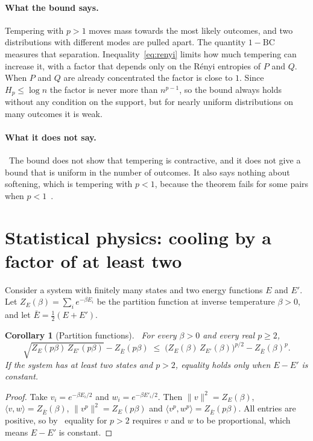 \documentclass[11pt]{article}
\newtheorem{corollary}{Corollary}[section]
\theoremstyle{remark}
\newcommand{\ip}[2]{\langle #1,#2\rangle}
\newcommand{\BC}{\mathrm{BC}}
\newcommand{\claimtag}[2]{\tcbox[on line,boxsep=1pt,left=3pt,right=3pt,top=0pt,bottom=0pt,colback=#1!10,colframe=#1!70,boxrule=0.4pt,arc=1.5pt]{\sffamily\scriptsize\bfseries\color{#1}#2}}
\newcommand{\consequence}{\claimtag{ForestGreen}{PROVED HERE}}
\newcommand{\nofollow}{\claimtag{warn}{DOES NOT FOLLOW}}
\begin{document}
\paragraph{What the bound says.} Tempering with $p>1$ moves mass towards the most likely outcomes, and two distributions with different modes are pulled apart. The quantity $1-\BC$ measures that separation. Inequality~\eqref{eq:renyi} limits how much tempering can increase it, with a factor that depends only on the Rényi entropies of $P$ and $Q$. When $P$ and $Q$ are already concentrated the factor is close to $1$. Since $H_p\le\log n$ the factor is never more than $n^{p-1}$, so the bound always holds without any condition on the support, but for nearly uniform distributions on many outcomes it is weak.

\paragraph{What it does not say.} \nofollow\ The bound does not show that tempering is contractive, and it does not give a bound that is uniform in the number of outcomes. It also says nothing about softening, which is tempering with $p<1$, because the theorem fails for some pairs when $p<1$~\cite{JPTV}.

\section{Statistical physics: cooling by a factor of at least two}\label{sec:phys}

Consider a system with finitely many states and two energy functions $E$ and $E'$. Let $Z_E(\beta)=\sum_ie^{-\beta E_i}$ be the partition function at inverse temperature $\beta>0$, and let $\bar E=\frac12(E+E')$.

\begin{corollary}[Partition functions]\label{cor:gibbs}
\consequence\ For every $\beta>0$ and every real $p\ge2$,
\[
\sqrt{Z_E(p\beta)\,Z_{E'}(p\beta)}-Z_{\bar E}(p\beta)\;\le\;\bigl(Z_E(\beta)\,Z_{E'}(\beta)\bigr)^{p/2}-Z_{\bar E}(\beta)^p .
\]
If the system has at least two states and $p>2$, equality holds only when $E-E'$ is constant.
\end{corollary}

\begin{proof}
Take $v_i=e^{-\beta E_i/2}$ and $w_i=e^{-\beta E'_i/2}$. Then $\|v\|^2=Z_E(\beta)$, $\ip vw=Z_{\bar E}(\beta)$, $\|v^p\|^2=Z_E(p\beta)$ and $\ip{v^p}{w^p}=Z_{\bar E}(p\beta)$. All entries are positive, so by~\cite[Theorem~2]{Paper} equality for $p>2$ requires $v$ and $w$ to be proportional, which means $E-E'$ is constant.
\end{proof}
\end{document}
